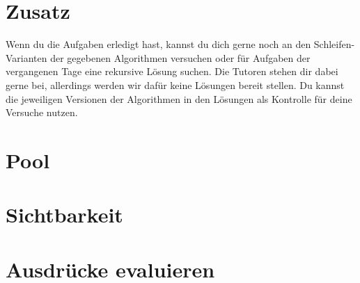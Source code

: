\documentclass[accentcolor=3c,colorbacktitle,12pt]{tudaexercise}
\newcounter{ex}\setcounter{ex}{1}
\begin{document}
\section{Zusatz}
Wenn du die Aufgaben erledigt hast, kannst du dich gerne noch an den Schleifen-Varianten der gegebenen Algorithmen versuchen oder für Aufgaben der vergangenen Tage eine rekursive Lösung suchen. Die Tutoren stehen dir dabei gerne bei, allerdings werden wir dafür keine Lösungen bereit stellen. Du kannst die jeweiligen Versionen der Algorithmen in den Lösungen als Kontrolle für deine Versuche nutzen.
\or%
\section{Pool}
\section{Sichtbarkeit}
\section{Ausdrücke evaluieren}
\else\fi
\end{document}
